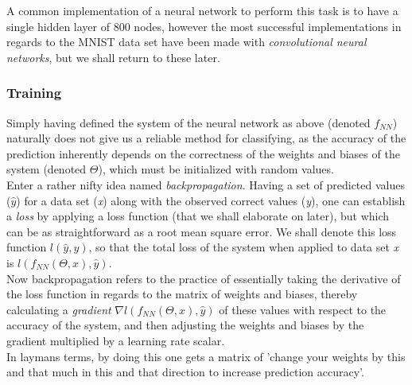 A common implementation of a neural network to perform this task is to have a single hidden layer of 800 nodes, however the most successful implementations in regards to the MNIST data set have been made with \textit{convolutional neural networks}, but we shall return to these later.

\subsubsection{Training}
Simply having defined the system of the neural network as above (denoted $f_{NN}$) naturally does not give us a reliable method for classifying, as the accuracy of the prediction inherently depends on the correctness of the weights and biases of the system (denoted $\Theta$), which must be initialized with random values. \\
Enter a rather nifty idea named \textit{backpropagation}. Having a set of predicted values ($\hat{y}$) for a data set (\textit{x}) along with the observed correct values (\textit{y}), one can establish a \textit{loss} by applying a loss function (that we shall elaborate on later), but which can be as straightforward as a root mean square error. We shall denote this loss function $l(\hat{y},y)$, so that the  total loss of the system when applied to data set \textit{x} is $l(f_{NN}(\Theta, x), \hat{y})$.\\
Now backpropagation refers to the practice of essentially taking the derivative of the loss function in regards to the matrix of weights and biases, thereby calculating a \textit{gradient} $\nabla{l(f_{NN}(\Theta, x), \hat{y})}$ of these values with respect to the accuracy of the system, and then adjusting the weights and biases by the gradient multiplied by a learning rate scalar.\\
In laymans terms, by doing this one gets a matrix of 'change your weights by this and that much in this and that direction to increase prediction accuracy'.
%
